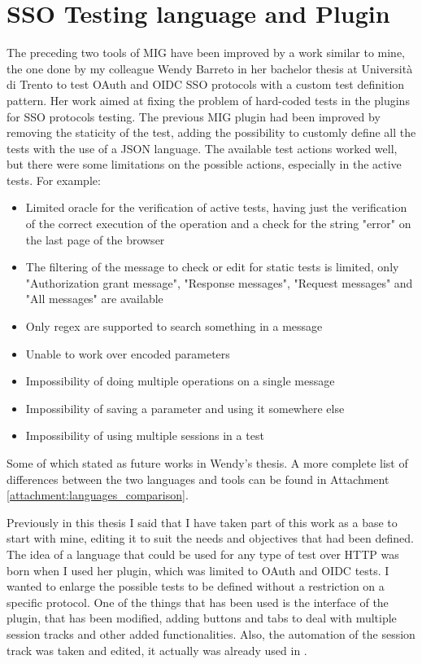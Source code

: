 \section{SSO Testing language and Plugin}
The preceding two tools of MIG have been improved by a work similar to mine, the one done by my colleague Wendy Barreto \cite{wendy_barreto} in her bachelor thesis at Università di Trento to test \Gls{OAuth} and \Gls{OIDC} SSO protocols with a custom test definition pattern. Her work aimed at fixing the problem of hard-coded tests in the plugins for SSO protocols testing. The previous MIG plugin had been improved by removing the staticity of the test, adding the possibility to customly define all the tests with the use of a JSON language.
The available test actions worked well, but there were some limitations on the possible actions, especially in the active tests. For example:
\begin{itemize}
    \item Limited oracle for the verification of active tests, having just the verification of the correct execution of the operation and a check for the string "error" on the last page of the browser
    \item The filtering of the message to check or edit for static tests is limited, only "Authorization grant message", "Response messages", "Request messages" and "All messages" are available
    \item Only regex are supported to search something in a message
    \item Unable to work over encoded parameters
    \item Impossibility of doing multiple operations on a single message
    \item Impossibility of saving a parameter and using it somewhere else
    \item Impossibility of using multiple sessions in a test
\end{itemize}
Some of which stated as future works in Wendy's thesis. A more complete list of differences between the two languages and tools can be found in Attachment \ref{attachment:languages_comparison}.

Previously in this thesis I said that I have taken part of this work as a base to start with mine, editing it to suit the needs and objectives that had been defined. The idea of a language that could be used for any type of test over HTTP was born when I used her plugin, which was limited to \Gls{OAuth} and \Gls{OIDC} tests. I wanted to enlarge the possible tests to be defined without a restriction on a specific protocol. 
One of the things that has been used is the interface of the plugin, that has been modified, adding buttons and tabs to deal with multiple \gls{session track}s and other added functionalities. Also, the automation of the \gls{session track} was taken and edited, it actually was already used in \cite{claudio_grisenti,stefano_facchini}.

